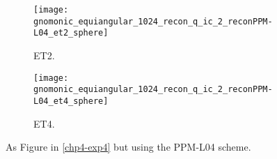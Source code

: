 \begin{figure}[!htb]
	\centering
	\begin{subfigure}{0.49\textwidth}
		\centering
		\texttt{[image: gnomonic\_equiangular\_1024\_recon\_q\_ic\_2\_reconPPM-L04\_et2\_sphere]}
		\caption{ET2.\label{chp4-exp5-a}}
	\end{subfigure}
	\begin{subfigure}{0.49\textwidth}
		\centering
		\texttt{[image: gnomonic\_equiangular\_1024\_recon\_q\_ic\_2\_reconPPM-L04\_et4\_sphere]}
		\caption{ET4.\label{chp4-exp5-b}}
	\end{subfigure}
	\caption{As Figure in \ref{chp4-exp4} but using the PPM-L04 scheme.\label{chp4-exp5}}
\end{figure}